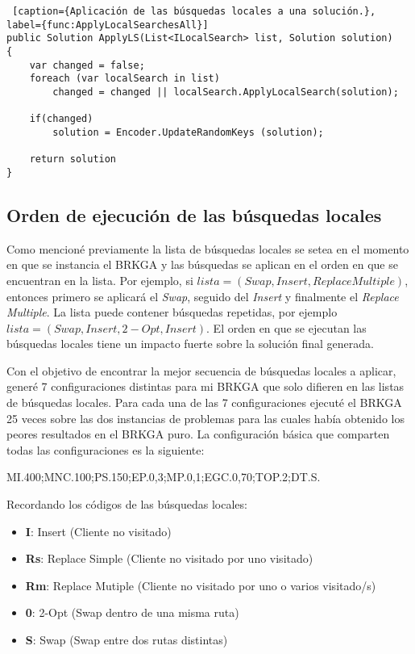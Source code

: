 \begin{minipage}{\textwidth}
\begin{lstlisting} [caption={Aplicación de las búsquedas locales a una solución.}, label={func:ApplyLocalSearchesAll}]
public Solution ApplyLS(List<ILocalSearch> list, Solution solution)
{	
	var changed = false;
	foreach (var localSearch in list)
		changed = changed || localSearch.ApplyLocalSearch(solution);

	if(changed)
		solution = Encoder.UpdateRandomKeys (solution);
	
	return solution
}
\end{lstlisting}
\end{minipage}

\subsection{Orden de ejecución de las búsquedas locales}

Como mencioné previamente la lista de búsquedas locales se setea en el momento en que se instancia el BRKGA y las búsquedas se aplican en el orden en que se encuentran en la lista. Por ejemplo, si $lista = (Swap, Insert, Replace Multiple)$, entonces primero se aplicará el \textit{Swap}, seguido del \textit{Insert} y finalmente el \textit{Replace Multiple}. La lista puede contener búsquedas repetidas, por ejemplo $lista = (Swap, Insert, 2-Opt, Insert)$. El orden en que se ejecutan las búsquedas locales tiene un impacto fuerte sobre la solución final generada.

\bigskip

Con el objetivo de encontrar la mejor secuencia de búsquedas locales a aplicar, generé 7 configuraciones distintas para mi BRKGA que solo difieren en las listas de búsquedas locales. Para cada una de las 7 configuraciones ejecuté el BRKGA 25 veces sobre las dos instancias de problemas para las cuales había obtenido los peores resultados en el BRKGA puro. La configuración básica que comparten todas las configuraciones es la siguiente: 

\bigskip

MI.400;MNC.100;PS.150;EP.0,3;MP.0,1;EGC.0,70;TOP.2;DT.S.

\bigskip

Recordando los códigos de las búsquedas locales: 
\begin{itemize}
  \item \textbf{I}: Insert (Cliente no visitado)
  \item \textbf{Rs}: Replace Simple (Cliente no visitado por uno visitado)
  \item \textbf{Rm}: Replace Mutiple (Cliente no visitado por uno o varios visitado/s)
  \item \textbf{0}: 2-Opt (Swap dentro de una misma ruta)
  \item \textbf{S}: Swap (Swap entre dos rutas distintas)
\end{itemize}

